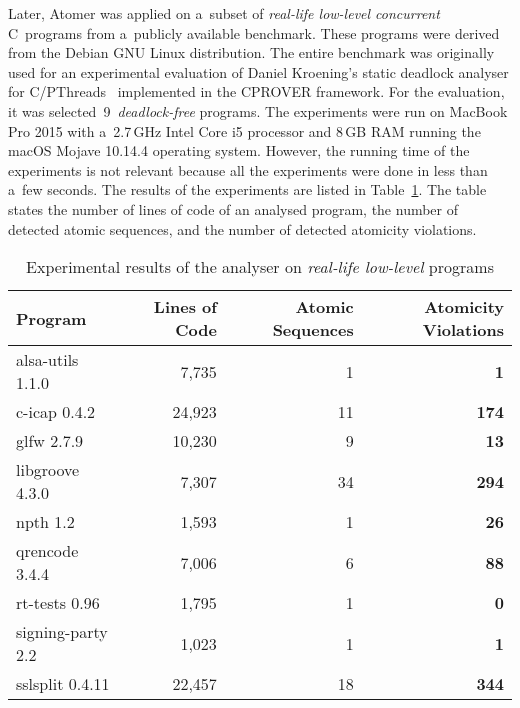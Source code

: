 Later, Atomer was applied on a~subset of \emph{real-life low-level
concurrent} C~programs from a~publicly available benchmark.
These programs were derived from the Debian GNU Linux distribution. The
entire benchmark was originally used for an experimental evaluation of
Daniel Kroening's static deadlock analyser for
C/PThreads~\cite{deadlockKroening} implemented in the CPROVER framework. For
the evaluation, it was selected~9~\emph{deadlock-free} programs. The experiments
were run on MacBook Pro 2015 with a~2.7\,GHz Intel Core i5 processor
and 8\,GB RAM running the macOS Mojave 10.14.4 operating system.
However, the running time of the experiments is not relevant because all
the experiments were done in less than a~few seconds. The results of the
experiments are listed in Table~\ref{tab:exp}. The table states the
number of lines of code of an analysed program, the number of detected
atomic sequences, and the number of detected atomicity violations.

\begin{table}[hbt]
    \centering

    \begin{tabular}{|l||r|r|r|}
        \hline
        Program & Lines of Code & Atomic Sequences
            & \textbf{Atomicity Violations} \\ \hline \hline

        alsa-utils 1.1.0 & 7,735 & 1 & \textbf{1} \\ \hline
        c-icap 0.4.2 & 24,923 & 11 & \textbf{174} \\ \hline
        glfw 2.7.9 & 10,230 & 9 & \textbf{13} \\ \hline
        libgroove 4.3.0 & 7,307 & 34 & \textbf{294} \\ \hline
        npth 1.2 & 1,593 & 1 & \textbf{26} \\ \hline
        qrencode 3.4.4 & 7,006 & 6 & \textbf{88} \\ \hline
        rt-tests 0.96 & 1,795 & 1 & \textbf{0} \\ \hline
        signing-party 2.2 & 1,023 & 1 & \textbf{1} \\ \hline
        sslsplit 0.4.11 & 22,457 & 18 & \textbf{344} \\ \hline
    \end{tabular}

    \caption{%
        Experimental results of the analyser on \emph{real-life
        low-level} programs
    }
    \label{tab:exp}
\end{table}

